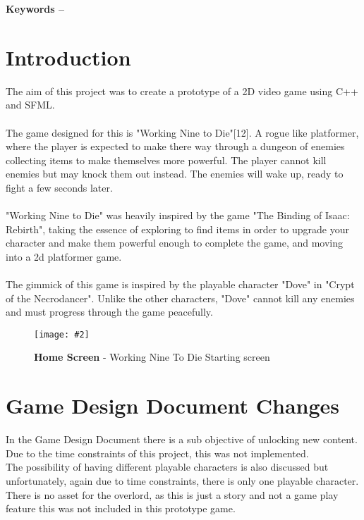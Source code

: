 \documentclass[10pt, a4paper]{article}
\title{\mytitle}
\author{\myauthor\hspace{1em}\\\contact\\Edinburgh Napier University\hspace{0.5em}-\hspace{0.5em}\mymodule}
\date{}
\newcommand{\figuremacro}[5]{
    \begin{figure}[#1]
        \centering
        \texttt{[image: \#2]}
        \caption[#3]{\textbf{#3}#4}
        \label{fig:#2}
    \end{figure}
}
\begin{document}
	\maketitle
    
	\textbf{Keywords -- }{\mykeywords}
	\section{Introduction}
	
	The aim of this project was to create a prototype of a 2D video game using C++ and SFML. \\\\
	The game designed for this is "Working Nine to Die"{[12]}. A rogue like platformer, where the player is expected to make there way through a dungeon of enemies collecting items to make themselves more powerful. The player cannot kill enemies but may knock them out instead. The enemies will wake up, ready to fight a few seconds later.\\\\
	"Working Nine to Die" was heavily inspired by the game "The Binding of Isaac: Rebirth", taking the essence of exploring to find items in order to upgrade your character and make them powerful enough to complete the game, and moving into a 2d platformer game.\\\\
	The gimmick of this game is inspired by the playable character "Dove" in "Crypt of the Necrodancer". Unlike the other characters, "Dove" cannot kill any enemies and must progress through the game peacefully.
    
    \figuremacro{h}{Home}{Home Screen}{ - Working Nine To Die Starting screen}{1.0}
	
	\section {Game Design Document Changes}
	In the Game Design Document there is a sub objective of unlocking new content. Due to the time constraints of this project, this was not implemented.\\
	
	The possibility of having different playable characters is also discussed but unfortunately, again due to time constraints, there is only one playable character.\\
	
	There is no asset for the overlord, as this is just a story and not a game play feature this was not included in this prototype game.\\
	
\end{document}
